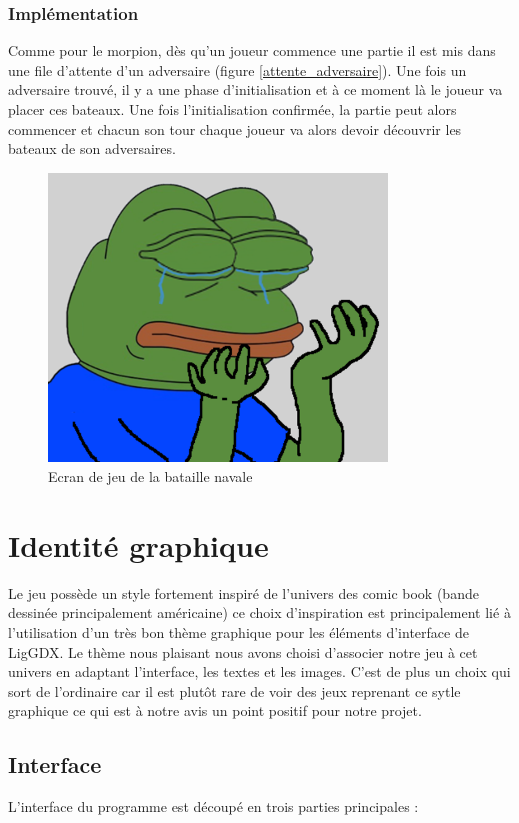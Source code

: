 \documentclass{report}
\begin{document}
\subsection{Implémentation}
Comme pour le morpion, dès qu'un joueur commence une partie il est mis dans une file d'attente d'un adversaire (figure \ref{attente_adversaire}).
Une fois un adversaire trouvé, il y a une phase d'initialisation et à ce moment là le joueur va placer ces bateaux. Une fois l'initialisation confirmée,
la partie peut alors commencer et chacun son tour chaque joueur va alors devoir découvrir les bateaux de son adversaires.

\begin{figure}[H]
	\centering\includegraphics[width=9cm]{notreBataille}
	\caption{Ecran de jeu de la bataille navale}
	\label{notreBataille}
\end{figure}

\chapter{Identité graphique}
Le jeu possède un style fortement inspiré de l'univers des comic book (bande dessinée principalement américaine)
ce choix d'inspiration est principalement lié à l'utilisation d'un très bon thème graphique pour les éléments
d'interface de LigGDX. Le thème nous plaisant nous avons choisi d'associer notre jeu à cet univers en adaptant l'interface, les
textes et les images. C'est de plus un choix qui sort de l'ordinaire car il est plutôt rare de voir des jeux
reprenant ce sytle graphique ce qui est à notre avis un point positif pour notre projet.

\section{Interface}
L'interface du programme est découpé en trois parties principales :
\end{document}
